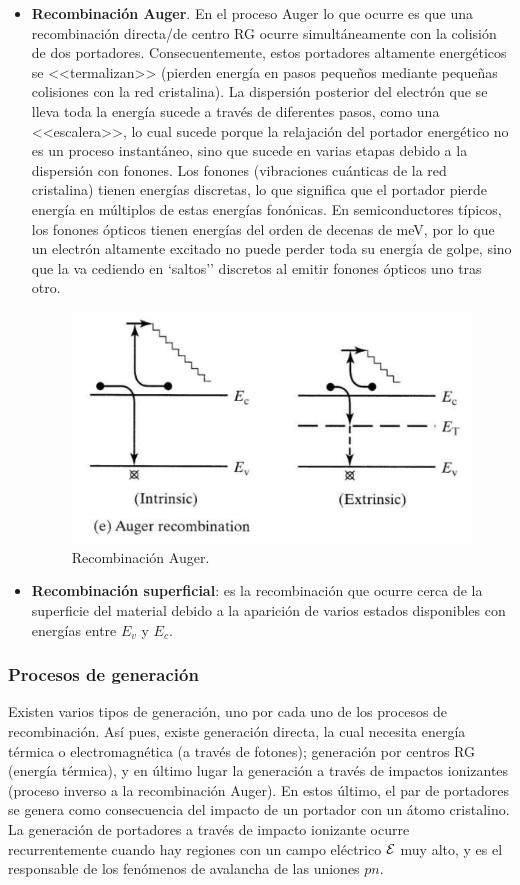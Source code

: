 \begin{itemize}
	\item \textbf{Recombinación Auger}. En el proceso Auger lo que ocurre es que una recombinación directa/de centro RG ocurre simultáneamente con la colisión de dos portadores. Consecuentemente, estos portadores altamente energéticos se <<termalizan>>  (pierden energía en pasos pequeños mediante pequeñas colisiones con la red cristalina). La dispersión posterior del electrón que se lleva toda la energía sucede a través de diferentes pasos, como una <<escalera>>, lo cual sucede  porque la relajación del portador energético no es un proceso instantáneo, sino que sucede en varias etapas debido a la dispersión con fonones. Los fonones (vibraciones cuánticas de la red cristalina) tienen energías discretas, lo que significa que el portador pierde energía en múltiplos de estas energías fonónicas. En semiconductores típicos, los fonones ópticos tienen energías del orden de decenas de meV, por lo que un electrón altamente excitado no puede perder toda su energía de golpe, sino que la va cediendo en `saltos'' discretos al emitir fonones ópticos uno tras otro.
	\begin{figure}[h!] \centering
		\includegraphics[width=0.7\linewidth]{Cuerpo/Ch_02/02_R_Auger.png}
		\caption{Recombinación Auger.}
	\end{figure}

	\item \textbf{Recombinación superficial}: es la recombinación que ocurre cerca de la superficie del material debido a la aparición de varios estados disponibles con energías entre $E_v$ y $E_c$. 
\end{itemize}


\subsubsection{Procesos de generación}

Existen varios tipos de generación, uno por cada uno de los procesos de recombinación. Así pues, existe generación directa, la cual necesita energía térmica o electromagnética (a través de fotones); generación por centros RG (energía térmica), y en último lugar la generación a través de impactos ionizantes (proceso inverso a la recombinación Auger). En estos último, el par de portadores se genera como consecuencia del impacto de un portador con un átomo cristalino. La generación de portadores a través de impacto ionizante ocurre recurrentemente cuando hay regiones con un campo eléctrico $\mathcal{E}$ muy alto, y es el responsable de los fenómenos de avalancha de las uniones $pn$.

